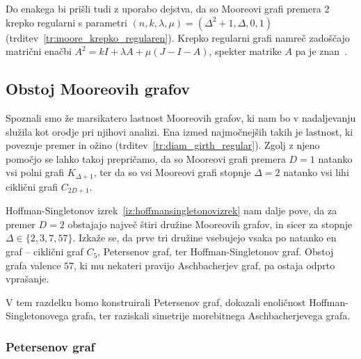 \documentclass[fin1, tisk]{fmfdelo}
\newcommand{\PPP}{\mathscr{P}_3}
\begin{document}
\begin{opomba}
Do enakega bi
prišli tudi z uporabo dejstva, 
da so Mooreovi grafi premera $2$ krepko regularni s parametri
$(n, k, \lambda, \mu) = (\Delta^2 + 1, \Delta, 0, 1)$ (trditev~\ref{tr:moore_krepko_regularen}).
Krepko regularni grafi namreč zadoščajo matrični enačbi $A^2 = kI + \lambda A + \mu(J - I - A)$,
spekter matrike $A$ pa je znan~\cite{enwiki1342817669}.
\end{opomba}


\subsection{Obstoj Mooreovih grafov}
Spoznali smo že marsikatero lastnost Mooreovih grafov, ki nam bo v nadaljevanju služila kot orodje pri njihovi
analizi. Ena izmed najmočnejših takih je lastnost, ki povezuje premer in ožino (trditev~\ref{tr:diam_girth_regular}).
Zgolj z njeno pomočjo se lahko takoj prepričamo, da so Mooreovi grafi 
premera $D=1$ natanko vsi polni grafi $K_{\Delta + 1}$, ter da so vsi Mooreovi grafi stopnje $\Delta = 2$ natanko vsi 
lihi ciklični grafi $C_{2D + 1}$.

Hoffman-Singletonov izrek~\ref{iz:hoffmansingletonovizrek} nam dalje pove, da za premer $D=2$ obstajajo 
največ štiri družine Mooreovih grafov, in sicer za stopnje $\Delta \in \{2, 3, 7, 57\}$.
Izkaže se, da prve tri družine vsebujejo vsaka po natanko en graf -- ciklični graf $C_5$,
Petersenov graf, ter Hoffman-Singletonov graf. 
Obstoj grafa valence $57$, ki mu nekateri pravijo Aschbacherjev graf, pa ostaja odprto vprašanje.

V tem razdelku bomo konstruirali Petersenov graf, dokazali enoličnost Hoffman-Singletonovega grafa, ter 
raziskali simetrije morebitnega Aschbacherjevega grafa.


\subsubsection{Petersenov graf}\label{sec:petersenov_graf}

\end{document}
